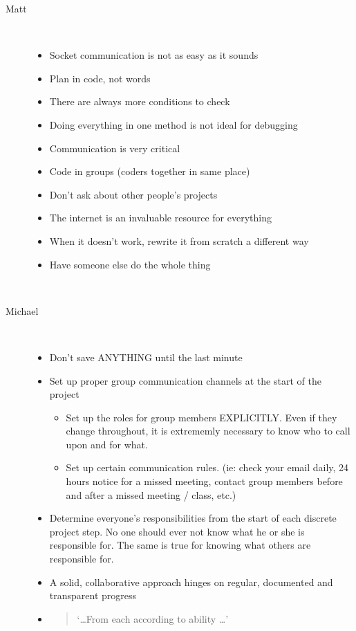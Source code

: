 \begin{description}
		\item[Matt] ~\\
			\begin{itemize}
					\item  Socket communication is not as easy as it sounds
					\item  Plan in code, not words
					\item  There are always more conditions to check
					\item  Doing everything in one method is not ideal for debugging
					\item  Communication is very critical
					\item  Code in groups (coders together in same place)
					\item  Don't ask about other people's projects
					\item  The internet is an invaluable resource for everything
					\item  When it doesn't work, rewrite it from scratch a different way
					\item  Have someone else do the whole thing
			\end{itemize}
		~\\ %
		\item[Michael] ~\\
			\begin{itemize}
				\item Don't save ANYTHING until the last minute
				\item Set up proper group communication channels at the start of the project
					\begin{itemize}
						\item Set up the roles for group members EXPLICITLY.  Even if they change throughout, it is extrememly necessary to know who to call upon and for what.
						\item Set up certain communication rules. (ie: check your email daily, 24 hours notice for a missed meeting, contact group members before and after a missed meeting / class, etc.)
					\end{itemize}				
				\item Determine everyone's responsibilities from the start of each discrete project step.  No one should ever not know what he or she is responsible for.  The same is true for knowing what others are responsible for.
				\item A solid, collaborative approach hinges on regular, documented and transparent progress
				\item \begin{quote}`\ldots From each according to ability \ldots'\end{quote}
			\end{itemize}
		

\end{description}
